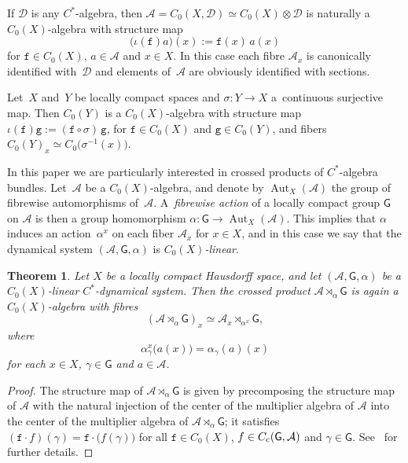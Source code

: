 \documentclass[pdftex]{sigma}
\numberwithin{equation}{section}
\newcommand{\Dcal}{\mathcal{D}}
\newcommand{\sfG}{\mathsf{G}}
\newcommand{\Aut}{\operatorname{Aut}}
\def\alg{{\mathcal A}}
\newtheorem{Theorem}{Theorem}[section]
\begin{document}
\begin{Example}
If $\Dcal$ is any $C^*$-algebra, then $\alg=C_0(X,\Dcal)\simeq
C_0(X)\otimes\Dcal$ is naturally a $C_0(X)$-algebra with structure map
\[
\big(\iota(\mathtt{f})a\big)(x) := \mathtt{f}(x)\,a(x)
\]
for $\mathtt{f}\in C_0(X)$, $a\in\alg$ and $x\in X$. In this case each fibre
$\alg_x$ is canonically identified with~$\Dcal$ and elements of~$\alg$
are obviously identified with sections.
\end{Example}

\begin{Example}\label{ex:ctsmaps}
Let~$X$ and~$Y$ be locally compact spaces and $\sigma\colon Y\to X$ a~continuous surjective map. Then $C_0(Y)$ is a $C_0(X)$-algebra with structure map
$\iota(\mathtt{f})\mathtt{g}:=(\mathtt{f}\circ\sigma)\,\mathtt{g}$, for $\mathtt{f}\in C_0(X)$ and $\mathtt{g}\in C_0(Y)$,
and fibers $C_0(Y)_x\simeq C_0\big(\sigma^{-1}(x)\big)$.
\end{Example}

In this paper we are particularly interested in crossed
products of $C^*$-algebra bundles. Let~$\alg$ be a $C_0(X)$-algebra,
and denote by $\Aut_X(\alg)$ the group of {fibrewise
automorphisms} of~$\alg$. A~\emph{fibrewise action} of a locally compact group $\sfG$ on
$\alg$ is then a group homomorphism $\alpha\colon \sfG\to\Aut_X(\alg)$. This
implies that $\alpha$ induces an action~$\alpha^x$ on each fiber
$\alg_x$ for $x\in X$, and in
this case we say that the dynamical system $(\alg,\sfG,\alpha)$ is
\emph{$C_0(X)$-linear}.

\begin{Theorem}\label{thm:crossedfibres}
Let $X$ be a locally compact Hausdorff space, and let
$(\alg,\sfG,\alpha)$ be a $C_0(X)$-linear $C^*$-dynamical system. Then
the crossed product $\alg\rtimes_\alpha\sfG$ is again a
$C_0(X)$-algebra with fibres
\[
(\alg\rtimes_\alpha\sfG)_x\simeq\alg_x\rtimes_{\alpha^x}\sfG ,
\]
where
\[
\alpha_\gamma^x\big(a(x)\big) = \alpha_\gamma(a)(x)
\]
for each $x\in X$, $\gamma\in\sfG$ and $a\in\alg$.
\end{Theorem}

\begin{proof}The structure map
of $\alg\rtimes_\alpha\sfG$ is given by precomposing the structure map
of $\alg$ with the natural injection of the center of the multiplier
algebra of $\alg$ into the center of the multiplier algebra of
$\alg\rtimes_\alpha\sfG$; it satisfies
$(\mathtt{f}\cdot f)(\gamma)=\mathtt{f}\cdot\big(f(\gamma)\big)$ for all
$\mathtt{f}\in C_0(X)$, $f\in C_{\rm c}(\sfG,\alg)$ and
$\gamma\in\sfG$. See~\cite[Theorem~8.4]{Williams2007} for further
details.
\end{proof}
\end{document}
